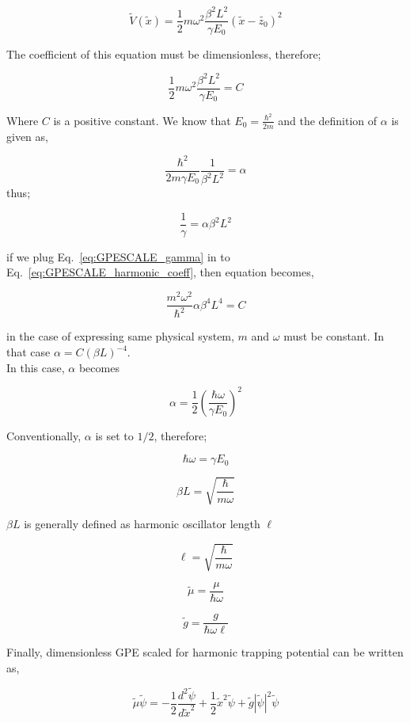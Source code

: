 \documentclass[a4paper,times,hidelinks,12pt]{article}
\begin{document}
\begin{equation}
\label{eq:GPESCALE_harmonic_energy_transform}
    \widetilde{V}(\widetilde{x}) = \frac{1}{2} m\omega^2 \frac{\beta^2 L^2}{\gamma E_0} (\widetilde{x}-\widetilde{z_0})^2  
\end{equation}

The coefficient of this equation must be dimensionless, therefore;

\begin{equation}
\label{eq:GPESCALE_harmonic_coeff}
    \frac{1}{2} m\omega^2 \frac{\beta^2 L^2}{\gamma E_0} = C
\end{equation}

Where $C$ is a positive constant. We know that $E_0 = \frac{\hbar^2}{2m}$ and the definition of $\alpha$ is given as,

\begin{equation}
\label{eq:GPESCALE_alpha}
    \frac{\hbar^2}{2m\gamma E_0} \frac{1}{\beta^2 L^2} = \alpha
\end{equation}
thus;

\begin{equation}
\label{eq:GPESCALE_gamma}
     \frac{1}{\gamma} = \alpha \beta^2 L^2
\end{equation}

if we plug Eq.~\eqref{eq:GPESCALE_gamma} in to Eq.~\eqref{eq:GPESCALE_harmonic_coeff}, then equation becomes,

\begin{equation}
\label{eq:GPESCALE_harmonic_coeff_2}
    \frac{m^2\omega^2}{\hbar^2} \alpha \beta^4 L^4 = C 
\end{equation} 

in the case of expressing same physical system, $m$ and $\omega$ must be constant. In that case $\alpha = C (\beta L)^{-4}$.\\


In this case, $\alpha$ becomes

$$ \alpha =  \frac{1}{2} \left(\frac{\hbar \omega}{\gamma E_0}\right)^2 $$

Conventionally, $\alpha$ is set to $1/2$, therefore;

$$ \hbar \omega = \gamma E_0 $$

$$ \beta L = \sqrt{\frac{\hbar}{m\omega}} $$ 

$ \beta L $ is generally defined as harmonic oscillator length $\ell$

$$ \ell = \sqrt{\frac{\hbar}{m\omega}} $$ 

$$ \widetilde{\mu} = \frac{\mu}{\hbar \omega} $$ 

$$ \widetilde{g} = \frac{g}{\hbar \omega \ell} $$

Finally, dimensionless GPE scaled for harmonic trapping potential can be written as,

$$\widetilde{\mu} \widetilde{\psi} = -\frac{1}{2}\frac{d^2\widetilde{\psi}}{d\widetilde{x}^2} + \frac{1}{2}\widetilde{x}^2\widetilde{\psi} + \widetilde{g}|\widetilde{\psi}|^2 \widetilde{\psi} $$
\end{document}
